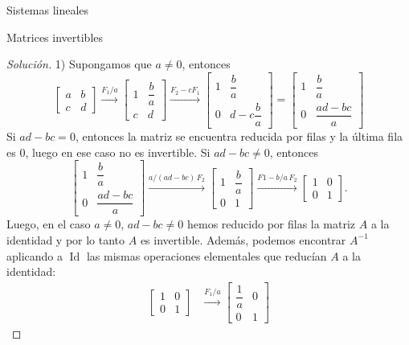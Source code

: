 \documentclass[a4paper,12pt,twoside,spanish,reqno]{amsbook}
\theoremstyle{definition}
\theoremstyle{remark}
\newcommand{\Id}{\operatorname{Id}}
\begin{document}
\begin{chapter}{Sistemas lineales}
\begin{section}{Matrices invertibles}
\begin{proof}[Solución]
                1) Supongamos que  $a\not=0$, entonces 
                \begin{equation*}
                \begin{bmatrix}a&b\\c&d\end{bmatrix} \stackrel{F_1/a}{\longrightarrow}
                \begin{bmatrix}1&\dfrac{b}{a}\\[6pt]c&d\end{bmatrix} \stackrel{F_2 -cF_1}{\longrightarrow}
                \begin{bmatrix}1&\dfrac{b}{a}\\[6pt]0&d- c\dfrac{b}{a}\end{bmatrix} =
                \begin{bmatrix}1&\dfrac{b}{a}\\[6pt]0&\dfrac{ad-bc}{a}\end{bmatrix}
                \end{equation*}   
                Si $ad-bc=0$,  entonces la matriz se encuentra reducida por filas y la última fila es $0$, luego en ese caso no es invertible.  Si $ad-bc\not=0$, entonces
                \begin{equation*}
                \begin{bmatrix}1&\dfrac{b}{a}\\[8pt]0&\dfrac{ad-bc}{a}\end{bmatrix} \stackrel{a/(ad-bc)\,F_2}{\longrightarrow}
                \begin{bmatrix}1&\dfrac{b}{a}\\[6pt]0&1\end{bmatrix}
                \stackrel{F1-b/a\,F_2}{\longrightarrow}
                \begin{bmatrix}1&0\\0&1\end{bmatrix}.
                \end{equation*} 
                Luego, en el caso $a\not=0$, $ad-bc\not=0$ hemos reducido por filas la matriz $A$  a la identidad y por lo tanto $A$  es invertible. Además, podemos encontrar $A^{-1}$ aplicando a $\Id$ las mismas operaciones elementales que reducían $A$ a la identidad:
                \begin{align*}
                \begin{bmatrix}1&0\\0&1\end{bmatrix} 
                &\stackrel{F_1/a}{\longrightarrow}
                \begin{bmatrix}\dfrac1a&0\\[8pt]0&1\end{bmatrix} 

\end{align*}
\end{proof}
\end{section}
\end{chapter}
\end{document}
